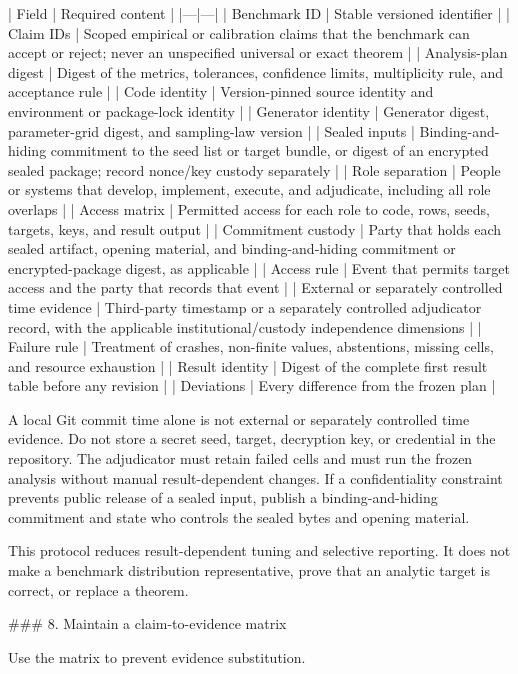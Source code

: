 \documentclass[11pt]{article}
\begin{document}
\begin{markdown}
| Field | Required content |
|---|---|
| Benchmark ID | Stable versioned identifier |
| Claim IDs | Scoped empirical or calibration claims that the benchmark can accept or reject; never an unspecified universal or exact theorem |
| Analysis-plan digest | Digest of the metrics, tolerances, confidence limits, multiplicity rule, and acceptance rule |
| Code identity | Version-pinned source identity and environment or package-lock identity |
| Generator identity | Generator digest, parameter-grid digest, and sampling-law version |
| Sealed inputs | Binding-and-hiding commitment to the seed list or target bundle, or digest of an encrypted sealed package; record nonce/key custody separately |
| Role separation | People or systems that develop, implement, execute, and adjudicate, including all role overlaps |
| Access matrix | Permitted access for each role to code, rows, seeds, targets, keys, and result output |
| Commitment custody | Party that holds each sealed artifact, opening material, and binding-and-hiding commitment or encrypted-package digest, as applicable |
| Access rule | Event that permits target access and the party that records that event |
| External or separately controlled time evidence | Third-party timestamp or a separately controlled adjudicator record, with the applicable institutional/custody independence dimensions |
| Failure rule | Treatment of crashes, non-finite values, abstentions, missing cells, and resource exhaustion |
| Result identity | Digest of the complete first result table before any revision |
| Deviations | Every difference from the frozen plan |

A local Git commit time alone is not external or separately controlled time evidence. Do not store a secret seed, target,
decryption key, or credential in the repository. The adjudicator must retain failed cells and must
run the frozen analysis without manual result-dependent changes. If a confidentiality constraint
prevents public release of a sealed input, publish a binding-and-hiding commitment and state who
controls the sealed bytes and opening material.

This protocol reduces result-dependent tuning and selective reporting. It does not make a
benchmark distribution representative, prove that an analytic target is correct, or replace a
theorem.

### 8. Maintain a claim-to-evidence matrix

Use the matrix to prevent evidence substitution.


\end{markdown}
\end{document}
